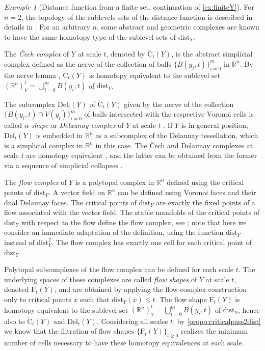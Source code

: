 \documentclass{amsart}
\newcommand{\dd}{\mathrm{dist}}
\theoremstyle{definition}
\theoremstyle{remark}
\newtheorem{example}[subsubsection]{Example}
\begin{document}
\begin{example}[Distance function from a finite set, continuation of \cref{ex:finiteY}]
For $n=2$, the topology of the sublevels sets of the distance function is described in details in \cite{siersma1999voronoi}. For an arbitrary $n$, some abstract and geometric complexes are known to have the same homotopy type of the sublevel sets of $\dd_Y$. 

The \emph{\v{C}ech complex} of $Y$ at scale $t$, denoted by  $\operatorname{\check{C}}_t(Y)$, is the abstract simplicial complex defined as the nerve of the collection of balls $\{B(y_i,t)\}_{i=0}^{m}$ in $\mathbb{R}^n$. By the nerve lemma \cite{borsuk1948imbedding,bauer2023unified}, 
$\operatorname{\check{C}}_t(Y)$ is homotopy equivalent to the sublevel set $(\mathbb{R}^n)_Y^t = \bigcup_{i=0}^{m} B(y_i,t)$ of $\dd_Y$. 

The subcomplex $\mathrm{Del}_t(Y)$ of $\operatorname{\check{C}}_t(Y)$ given by the nerve of the collection $\{B(y_i,t)\cap V(y_i)\}_{i=0}^{m}$ of balls intersected with the respective Voronoi cells is called \emph{$\alpha$-shape} or \emph{Delaunay complex} of $Y$ at scale $t$ \cite{edelsbrunner1995union}. If $Y$ is in general position, $\mathrm{Del}_t(Y)$ is embedded in $\mathbb{R}^n$ as a subcomplex of the Delaunay tessellation, which is a simplicial complex in $\mathbb{R}^n$ in this case. The \v{C}ech and Delaunay complexes at scale $t$ are homotopy equivalent \cite{edelsbrunner1995union}, and the latter can be obtained from the former via a sequence of simplicial collapses \cite{bauer2017morse}.

The \emph{flow complex} of $Y$ \cite{giesen2008flow,buchin2008recursive} is a polytopal complex in $\mathbb{R}^n$ defined using the critical points of $\dd_Y$. A vector field on $\mathbb{R}^n$ can be defined using Voronoi faces and their dual Delaunay faces. The critical points of $\dd_Y$ are exactly the fixed points of a flow associated with the vector field. 
The stable manifolds of the critical points of $\dd_Y$ with respect to the flow define the flow complex, see \cite[Sect.~3]{buchin2008recursive}; note that here we consider an immediate adaptation of the definition, using the function $\dd_Y$ instead of $\dd^2_Y$. The flow complex has exactly one cell for each critical point of $\dd_Y$. 

Polytopal subcomplexes of the flow complex can be defined for each scale $t$. The underlying spaces of these complexes are called \emph{flow shapes} of $Y$ at scale $t$, denoted $\mathrm{F}_t(Y)$, and are obtained by applying the flow complex construction only to critical points $x$ such that $\dd_Y(x)\le t$.
The flow shape $\mathrm{F}_t(Y)$ is homotopy equivalent \cite{buchin2008recursive} to the sublevel set $(\mathbb{R}^n)_Y^t = \bigcup_{i=0}^{m} B(y_i,t)$ of $\dd_Y$, hence also to $\operatorname{\check{C}}_t(Y)$ and $\mathrm{Del}_t (Y)$. 
Considering all scales $t$, by \cref{propo:criticalpass2dist} we know that the filtration of flow shapes $\{\mathrm{F}_t(Y)\}_{t\ge 0}$ realizes the minimum number of cells necessary to have  these homotopy equivalences at each scale.
\end{example}
\end{document}
